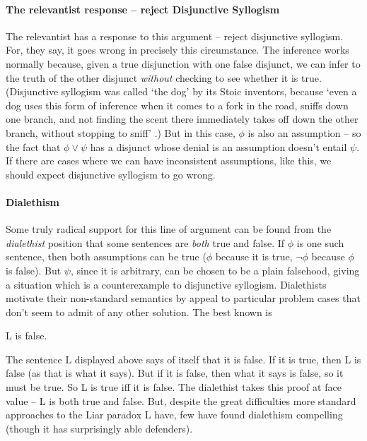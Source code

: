 \paragraph{The relevantist response – reject Disjunctive Syllogism} The relevantist has a response to this argument – reject disjunctive syllogism. For, they say, it goes wrong in precisely this circumstance. The inference works normally because, given a true disjunction with one false disjunct, we can infer to the truth of the other disjunct \emph{without} checking to see whether it is true. (Disjunctive syllogism was called `the dog' by its Stoic inventors, because `even a dog uses this form of inference when it comes to a fork in the road, sniffs down one branch, and not finding the scent there immediately takes off down the other branch, without stopping to sniff' \citep[99--100]{burphilo}.) But in this case, $\phi$  is also an assumption – so the fact that $\phi \vee \psi$ has a disjunct whose denial is an assumption doesn't entail $\psi$. If there are cases where we can have inconsistent assumptions, like this, we should expect disjunctive syllogism to go wrong.

\paragraph{Dialethism} Some truly radical support for this line of argument can be found from the \emph{dialethist} position that some sentences are \emph{both} true and false. If $\phi$ is one such sentence, then both assumptions can be true ($\phi$ because it is true, $\neg\phi$ because $\phi$ is false). But $\psi$, since it is arbitrary, can be chosen to be a plain falsehood, giving a situation  which is a counterexample to disjunctive syllogism. Dialethists motivate their non-standard semantics by appeal to particular problem cases that don't seem to admit of any other solution. The best known is \begin{exe}
	 L is false.
\end{exe} The sentence L displayed above says of itself that it is false. If it is true, then L is false (as that is what it says). But if it is false, then what it says is false, so it must be true. So L is true iff it is false. The dialethist takes this proof at face value – L is both true and false. But, despite the great difficulties more standard approaches to the Liar paradox L have, few have found dialethism compelling (though it has surprisingly able defenders). 

